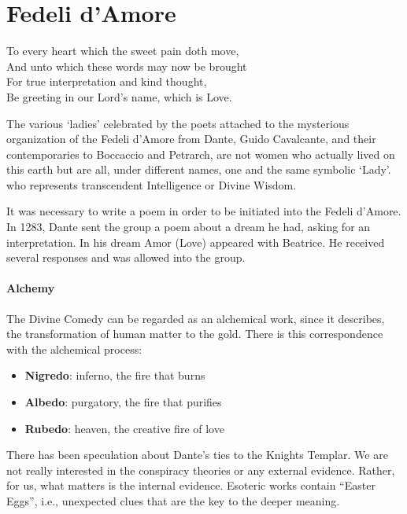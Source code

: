 \section{Fedeli d'Amore}

\begin{quotex}
To every heart which the sweet pain doth move,\\
And unto which these words may now be brought\\
For true interpretation and kind thought,\\
Be greeting in our Lord's name, which is Love. 

The various `ladies' celebrated by the poets attached to the mysterious organization of the Fedeli d'Amore from Dante, Guido Cavalcante, and their contemporaries to Boccaccio and Petrarch, are not women who actually lived on this earth but are all, under different names, one and the same symbolic `Lady'. who represents transcendent Intelligence or Divine Wisdom. 

\end{quotex}
It was necessary to write a poem in order to be initiated into the Fedeli d'Amore. In 1283, Dante sent the group a poem about a dream he had, asking for an interpretation. In his dream Amor (Love) appeared with Beatrice. He received several responses and was allowed into the group.

\paragraph{Alchemy}
The Divine Comedy can be regarded as an alchemical work, since it describes, the transformation of human matter to the gold. There is this correspondence with the alchemical process:

\begin{itemize}
\item \textbf{Nigredo}: inferno, the fire that burns 
\item \textbf{Albedo}: purgatory, the fire that purifies 
\item \textbf{Rubedo}: heaven, the creative fire of love 
\end{itemize}
There has been speculation about Dante's ties to the Knights Templar. We are not really interested in the conspiracy theories or any external evidence. Rather, for us, what matters is the internal evidence. Esoteric works contain “Easter Eggs”, i.e., unexpected clues that are the key to the deeper meaning.

